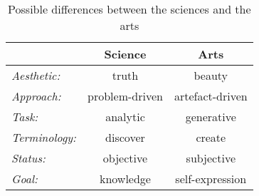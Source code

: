 \documentclass[letterpaper]{article}
\begin{document}
\begin{table}
\begin{center}
 \begin{tabular}{||l c c ||} 
 \hline
 & {\bf Science} & {\bf Arts} \\[0.5ex] 
 \hline\hline
{\em Aesthetic:} & truth & beauty \\ \hline
 
{\em Approach:} & problem-driven & artefact-driven \\ \hline

{\em Task:} & analytic & generative \\ \hline

{\em Terminology:} & discover & create \\ \hline

{\em Status:} & objective & subjective \\ \hline

{\em Goal:} & knowledge & self-expression \\ \hline

 \end{tabular} \caption{Possible differences between the sciences and the arts}
\end{center}
\label{Table:differences}
\end{table}
\end{document}
